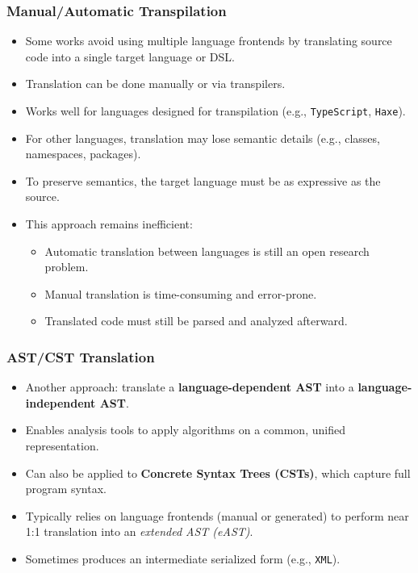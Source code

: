 \documentclass[dvipsnames, 10pt, table]{beamer}
\begin{document}
\begin{frame}
  \frametitle{Manual/Automatic Transpilation}
  \begin{itemize}
      \item Some works avoid using multiple language frontends by translating source code into a single target language or DSL.
      \item Translation can be done manually or via transpilers.
      \item Works well for languages designed for transpilation (e.g., \texttt{TypeScript}, \texttt{Haxe}).
      \item For other languages, translation may lose semantic details (e.g., classes, namespaces, packages).
      \item To preserve semantics, the target language must be as expressive as the source.
      \item This approach remains inefficient:
      \begin{itemize}
          \item Automatic translation between languages is still an open research problem.
          \item Manual translation is time-consuming and error-prone.
          \item Translated code must still be parsed and analyzed afterward.
      \end{itemize}
  \end{itemize}
\end{frame}

\begin{frame}
  \frametitle{AST/CST Translation}
  \begin{itemize}
      \item Another approach: translate a \textbf{language-dependent AST} into a \textbf{language-independent AST}.
      \item Enables analysis tools to apply algorithms on a common, unified representation.
      \item Can also be applied to \textbf{Concrete Syntax Trees (CSTs)}, which capture full program syntax.
      \item Typically relies on language frontends (manual or generated) to perform near 1:1 translation into an \textit{extended AST (eAST)}.
      \item Sometimes produces an intermediate serialized form (e.g., \texttt{XML}).
  \end{itemize}
\end{frame}
\end{document}
